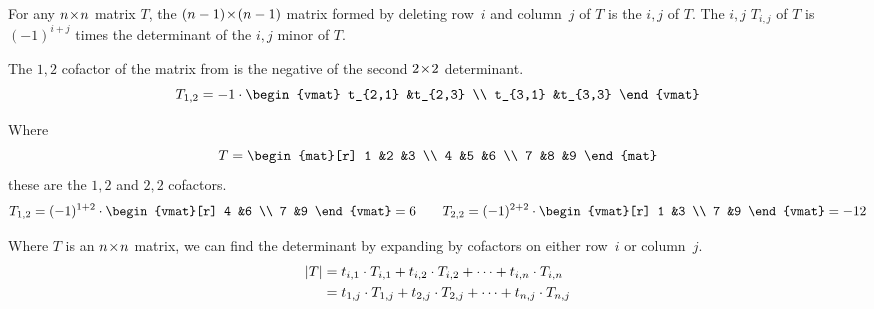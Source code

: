 \begin{definition}
For any \( n \! \times \! n \) matrix \( T \), the \( (n-1) \! \times \! (n-1) \) matrix formed by
deleting row~\( i \) and column~\( j \) of \( T \) is the
\( i,j \) %
of \( T \).
The \( i,j \) %
\( T_{i,j} \) of \( T \) is
\( (-1)^{i+j} \) times the determinant of the \( i,j \) minor of \( T \).
\end{definition}

\begin{example}
The $1,2$ cofactor of the matrix from 
is the negative of the second $2 \! \times \! 2$ determinant.
\begin{equation*}
  T_{1,2}=
  -1\cdot\begin{vmat}
    t_{2,1}  &t_{2,3}  \\
    t_{3,1}  &t_{3,3}
  \end{vmat}
\end{equation*}
\end{example}

\begin{example}
Where
\begin{equation*}
   T=
   \begin{mat}[r]
      1  &2  &3  \\
      4  &5  &6  \\
      7  &8  &9
   \end{mat}
\end{equation*}
these are the  \( 1,2 \) and \( 2,2 \) cofactors.
\begin{equation*}
   T_{1,2}=
   (-1)^{1+2}\cdot\begin{vmat}[r]
                4  &6  \\
                7  &9
             \end{vmat}=6
  \qquad
   T_{2,2}=
   (-1)^{2+2}\cdot\begin{vmat}[r]
                1  &3  \\
                7  &9
             \end{vmat}=-12
\end{equation*}
\end{example}

\begin{theorem}
\label{th:LaPlaceExp}
%
Where \( T \) is an \( n \! \times \! n \) matrix, we can find
the determinant by expanding by cofactors on either
row~$i$ or column~$j$.
\begin{align*}
   \deter{T}
   &=t_{i,1}\cdot T_{i,1}+t_{i,2}\cdot T_{i,2}+\cdots+t_{i,n}\cdot T_{i,n}  \\
   &=t_{1,j}\cdot T_{1,j}+t_{2,j}\cdot T_{2,j}+\cdots+t_{n,j}\cdot T_{n,j}
\end{align*}
\end{theorem}

